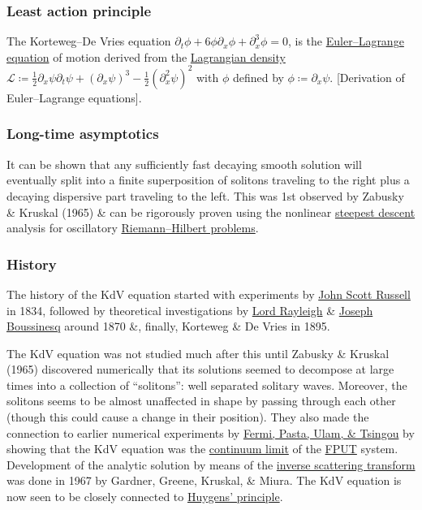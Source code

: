 \documentclass{article}
\begin{document}
\subsubsection{Least action principle}
The Korteweg--De Vries equation $\partial_t\phi + 6\phi\partial_x\phi + \partial_x^3\phi = 0$, is the \href{https://en.wikipedia.org/wiki/Euler%E2%80%93Lagrange_equation}{Euler--Lagrange equation} of motion derived from the \href{https://en.wikipedia.org/wiki/Lagrangian_density}{Lagrangian density} $\mathcal{L}\coloneqq\frac{1}{2}\partial_x\psi\partial_t\psi + (\partial_x\psi)^3 - \frac{1}{2}(\partial_x^2\psi)^2$ with $\phi$ defined by $\phi\coloneqq\partial_x\psi$. [Derivation of Euler--Lagrange equations].

\subsubsection{Long-time asymptotics}
It can be shown that any sufficiently fast decaying smooth solution will eventually split into a finite superposition of solitons traveling to the right plus a decaying dispersive part traveling to the left. This was 1st observed by {\sf Zabusky \& Kruskal} (1965) \& can be rigorously proven using the nonlinear \href{https://en.wikipedia.org/wiki/Method_of_steepest_descent}{steepest descent} analysis for oscillatory \href{https://en.wikipedia.org/wiki/Riemann%E2%80%93Hilbert_problem}{Riemann--Hilbert problems}.

\subsubsection{History}
The history of the KdV equation started with experiments by \href{https://en.wikipedia.org/wiki/John_Scott_Russell}{\sc John Scott Russell} in 1834, followed by theoretical investigations by \href{https://en.wikipedia.org/wiki/Lord_Rayleigh}{\sc Lord Rayleigh} \& \href{https://en.wikipedia.org/wiki/Joseph_Boussinesq}{\sc Joseph Boussinesq} around 1870 \&, finally, {\sc Korteweg \& De Vries} in 1895.

The KdV equation was not studied much after this until {\sf Zabusky \& Kruskal} (1965) discovered numerically that its solutions seemed to decompose at large times into a collection of ``solitons'': well separated solitary waves. Moreover, the solitons seems to be almost unaffected in shape by passing through each other (though this could cause a change in their position). They also made the connection to earlier numerical experiments by \href{https://en.wikipedia.org/wiki/Fermi%E2%80%93Pasta%E2%80%93Ulam%E2%80%93Tsingou_problem}{\sc Fermi, Pasta, Ulam, \& Tsingou} by showing that the KdV equation was the \href{https://en.wikipedia.org/wiki/Continuum_limit}{continuum limit} of the \href{https://en.wikipedia.org/wiki/Fermi%E2%80%93Pasta%E2%80%93Ulam%E2%80%93Tsingou_problem}{FPUT} system. Development of the analytic solution by means of the \href{https://en.wikipedia.org/wiki/Inverse_scattering_transform}{inverse scattering transform} was done in 1967 by {\sc Gardner, Greene, Kruskal, \& Miura}. The KdV equation is now seen to be closely connected to \href{https://en.wikipedia.org/wiki/Huygens%27_principle}{Huygens' principle}.
\end{document}
